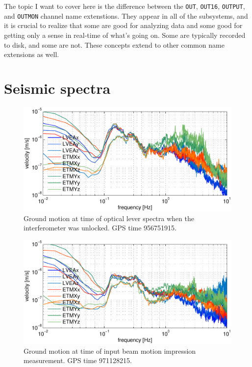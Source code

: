 The topic I want to cover here is the difference between the
\texttt{OUT}, \texttt{OUT16}, \texttt{OUTPUT}, and \texttt{OUTMON}
channel name extenstions. They appear in all of the subsystems, and it
is crucial to realize that some are good for analyzing data and some
good for getting only a sense in real-time of what's going on. Some
are typically recorded to disk, and some are not. These concepts
extend to other common name extensions as well. 



\section{Seismic spectra}
\label{sec:groundmotion}


\begin{figure}
\begin{centering}
\includegraphics[width=1.0\textwidth]{figures/seis956751915_nolock.pdf}
\caption[]{Ground motion at time of optical lever spectra when the
  interferometer was unlocked. GPS time 956751915.}
\label{fig:seismic_nolock}
\end{centering}
\end{figure}

\begin{figure}
\begin{centering}
\includegraphics[width=1.0\textwidth]{figures/seis971128215_highWFSgain.pdf}
\caption[]{Ground motion at time of input beam motion impression
  measurement. GPS time 971128215.}
\label{fig:seismic_highgain}
\end{centering}
\end{figure}




